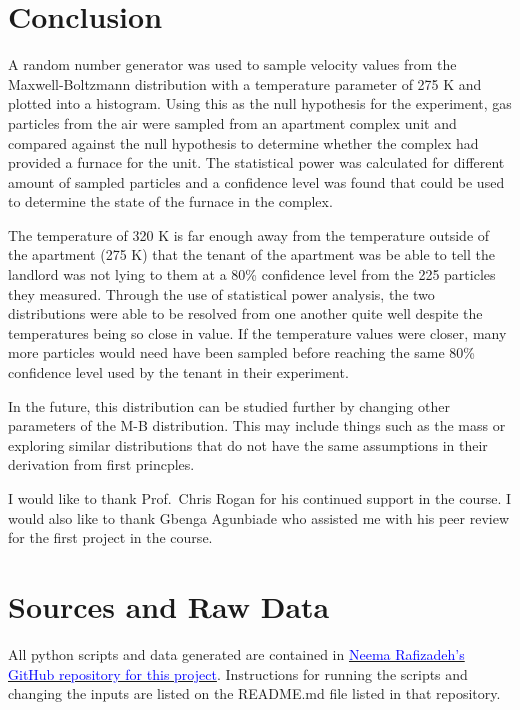\documentclass[%
 reprint,
 amsmath,amssymb,
 aps,
]{revtex4-2}
\begin{document}
\section{Conclusion}

A random number generator was used to sample velocity values from the Maxwell-Boltzmann distribution with a temperature parameter of 275 K and plotted into a histogram. Using this as the null hypothesis for the experiment, gas particles from the air were sampled from an apartment complex unit and compared against the null hypothesis to determine whether the complex had provided a furnace for the unit. The statistical power was calculated for different amount of sampled particles and a confidence level was found that could be used to determine the state of the furnace in the complex.

The temperature of 320 K is far enough away from the temperature outside of the apartment (275 K) that the tenant of the apartment was be able to tell the landlord was not lying to them at a 80\% confidence level from the 225 particles they measured. Through the use of statistical power analysis, the two distributions were able to be resolved from one another quite well despite the temperatures being so close in value. If the temperature values were closer, many more particles would need have been sampled before reaching the same 80\% confidence level used by the tenant in their experiment. 

In the future, this distribution can be studied further by changing other parameters of the M-B distribution. This may include things such as the mass or exploring similar distributions that do not have the same assumptions in their derivation from first princples. 

\acknowledgements

I would like to thank Prof.\ Chris Rogan for his continued support in the course. I would also like to thank Gbenga Agunbiade who assisted me with his peer review for the first project in the course.

\appendix
\section{Sources and Raw Data}

All python scripts and data generated are contained in \href{https://github.com/rafizadehn/PHSX815_Project2}{\textcolor{blue}{Neema Rafizadeh's GitHub repository for this project}}. Instructions for running the scripts and changing the inputs are listed on the README.md file listed in that repository. 
\end{document}
